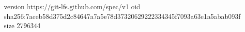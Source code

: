 version https://git-lfs.github.com/spec/v1
oid sha256:7aeeb58d375d2c84647a7a5e78d37320629222334345f7093a63e1a5abab093f
size 2796344
